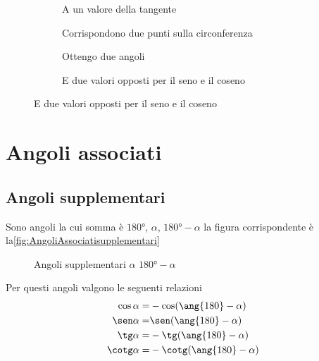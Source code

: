\begin{figure}
	\begin{subfigure}[b]{.5\linewidth}
		\centering
		\caption{A un valore della tangente}\label{fig:SenoCosenoNototangente1}
	\end{subfigure}%
	\begin{subfigure}[b]{.5\linewidth}
		\centering
		\caption{Corrispondono due punti sulla circonferenza}\label{fig:SenoCosenoNototangente2}
	\end{subfigure}
	\begin{subfigure}[b]{.5\linewidth}
		\centering
		\caption{Ottengo due angoli}\label{fig:SenoCosenoNototangente3}
	\end{subfigure}%
	\begin{subfigure}[b]{.5\linewidth}
		\centering
		\caption{E due valori opposti per il seno e il coseno}\label{fig:SenoCosenoNototangente4}
	\end{subfigure}
	\label{fig:senoNotoCosenoEs1}
\end{figure}
\section{Angoli associati}
\label{sec:goniometriaAngoliAssociati}
\subsection{Angoli supplementari}
Sono angoli la cui somma è $\ang{180}$, $\alpha$, $\ang{180}-\alpha$ la figura corrispondente è la\nobs\vref{fig:AngoliAssociatisupplementari}
\begin{figure}
	\centering

	\caption{Angoli supplementari $\alpha$ $\ang{180}-\alpha$}
	\label{fig:AngoliAssociatisupplementari}
\end{figure}
Per questi angoli valgono le seguenti relazioni
\begin{align*}
\cos\alpha=&{}-\cos(\ang{180}-\alpha)\\
\sen\alpha=&{}\sen(\ang{180}-\alpha)\\
\tg\alpha=&{}-\tg(\ang{180}-\alpha)\\
\cotg\alpha=&{}-\cotg(\ang{180}-\alpha)
\end{align*}
